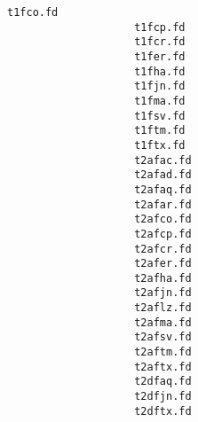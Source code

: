 \begin{lstlisting}[frame=tb, extendedchars=false, breaklines=false, basicstyle=\footnotesize\upshape ,columns=flexible ,keepspaces=true , lineskip={-7.0pt} ]
                    t1fco.fd
                    t1fcp.fd
                    t1fcr.fd
                    t1fer.fd
                    t1fha.fd
                    t1fjn.fd
                    t1fma.fd
                    t1fsv.fd
                    t1ftm.fd
                    t1ftx.fd
                    t2afac.fd
                    t2afad.fd
                    t2afaq.fd
                    t2afar.fd
                    t2afco.fd
                    t2afcp.fd
                    t2afcr.fd
                    t2afer.fd
                    t2afha.fd
                    t2afjn.fd
                    t2aflz.fd
                    t2afma.fd
                    t2afsv.fd
                    t2aftm.fd
                    t2aftx.fd
                    t2dfaq.fd
                    t2dfjn.fd
                    t2dftx.fd
\end{lstlisting}



